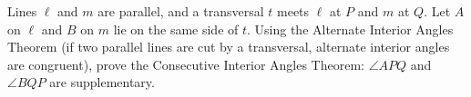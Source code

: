 Lines $\ell$ and $m$ are parallel, and a transversal $t$ meets $\ell$ at $P$ and $m$ at $Q$. Let $A$ on $\ell$ and $B$ on $m$ lie on the same side of $t$. Using the Alternate Interior Angles Theorem (if two parallel lines are cut by a transversal, alternate interior angles are congruent), prove the Consecutive Interior Angles Theorem: $\angle APQ$ and $\angle BQP$ are supplementary.
